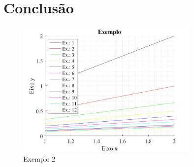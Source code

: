 \lipsum[6-11]

\chapter{Conclusão}

\lipsum[11-16]

\begin{figure}[H]
    \centering
    \includegraphics[width=0.8\textwidth]{images/exemplo2.jpg}
    \caption{Exemplo 2}
    \label{fig:exemplo 2}
\end{figure}

\lipsum[12-13]
